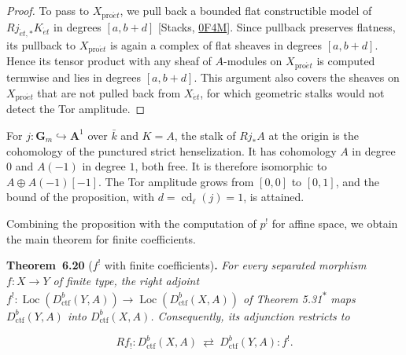 \documentclass[11pt]{article}
\newenvironment{bpstatement}[2]{\par\addvspace{0.6\baselineskip}\noindent\textbf{#1}#2\textbf{.}\enspace\ignorespaces}
  {\par\addvspace{0.4\baselineskip}}
\newenvironment{bpstatementit}[2]{\begin{bpstatement}{#1}{#2}\itshape\ignorespaces}{\end{bpstatement}}
\newcommand{\bpout}[1]{#1\textsuperscript{\hyperlink{bp-outside}{\ensuremath{\ast}}}}
\providecommand{\Loc}{}\renewcommand{\Loc}{\operatorname{Loc}}
\begin{document}
\begin{proof}[{Proof}]
To pass to \(X_{\mathrm{pro}\acute{e}t}\), we pull back a bounded flat constructible model of \(Rj_{\acute{e}t,*}K_{\acute{e}t}\) in degrees \([a,b+d]\) [Stacks, \href{https://stacks.math.columbia.edu/tag/0F4M}{0F4M}]. Since pullback preserves flatness, its pullback to \(X_{\mathrm{pro}\acute{e}t}\) is again a complex of flat sheaves in degrees \([a,b+d]\). Hence its tensor product with any sheaf of \(A\)-modules on \(X_{\mathrm{pro}\acute{e}t}\) is computed termwise and lies in degrees \([a,b+d]\). This argument also covers the sheaves on \(X_{\mathrm{pro}\acute{e}t}\) that are not pulled back from \(X_{\acute{e}t}\), for which geometric stalks would not detect the Tor amplitude.
\end{proof}

\label{bp60}%
For \(j:\mathbf G_m\hookrightarrow\mathbf A^1\) over \(\bar k\) and \(K=A\), the stalk of \(Rj_*A\) at the origin is the cohomology of the punctured strict henselization. It has cohomology \(A\) in degree \(0\) and \(A(-1)\) in degree \(1\), both free. It is therefore isomorphic to \(A\oplus A(-1)[-1]\). The Tor amplitude grows from \([0,0]\) to \([0,1]\), and the bound of the proposition, with \(d=\operatorname{cd}_\ell(j)=1\), is attained.

Combining the proposition with the computation of \(p^!\) for affine space, we obtain the main theorem for finite coefficients.

\label{bp61}%
\begin{bpstatementit}{Theorem~6.20}{ ($f^!$ with finite coefficients)}
For every separated morphism \(f:X\to Y\) of finite type, the right adjoint \(f^!:\Loc(D^b_{\mathrm{ctf}}(Y,A))\to\Loc(D^b_{\mathrm{ctf}}(X,A))\) of Theorem \bpout{5.31} maps \(D^b_{\mathrm{ctf}}(Y,A)\) into \(D^b_{\mathrm{ctf}}(X,A)\). Consequently, its adjunction restricts to

\[
Rf_!:D^b_{\mathrm{ctf}}(X,A)\ \rightleftarrows\ D^b_{\mathrm{ctf}}(Y,A):f^!.
\]
\end{bpstatementit}
\end{document}
